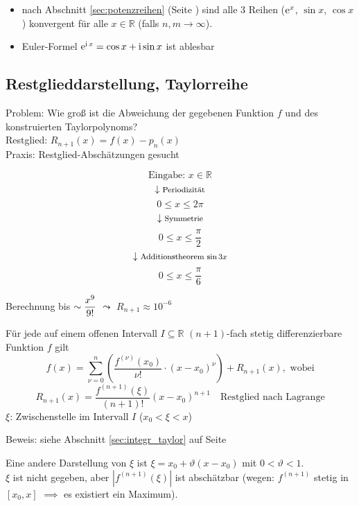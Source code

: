 \begin{note}
  \begin{itemize}
    \item nach Abschnitt \ref{sec:potenzreihen} (Seite \pageref{sec:potenzreihen}) sind alle 3 Reihen ($\operatorname{e}^x$, $\sin x$, $\cos x$) konvergent für alle $x \in \mathbb{R}$ (falls $n, m \rightarrow \infty$).
    \item Euler-Formel $\operatorname{e}^{\operatorname{i} x} = \cos x + \operatorname{i} \sin x$ ist ablesbar
  \end{itemize}
\end{note}

\subsection{Restglieddarstellung, Taylorreihe}
\label{sub:Restglieddarstellung}

Problem: Wie groß ist die Abweichung der gegebenen Funktion $f$ und des konstruierten Taylorpolynoms?\\
Restglied: $R_{n+1}(x) = f(x) - p_n(x)$\\
Praxis: Restglied-Abschätzungen gesucht
%
\begin{example}
  \[ \text{Eingabe: } x \in \mathbb{R} \]
  \[ \downarrow \text{\footnotesize Periodizität} \]
  \[ 0 \leq x \leq 2 \pi \]
  \[ \downarrow \text{\footnotesize Symmetrie} \]
  \[ 0 \leq x \leq \frac \pi 2 \]
  \[ \downarrow \text{\footnotesize Additionstheorem $\sin 3x$} \]
  \[ 0 \leq x \leq \frac \pi 6 \]
  \begin{center} Berechnung bis $\sim\displaystyle \frac{x^9}{9!}$ $\leadsto$ $R_{n+1} \approx 10^{-6}$ \end{center}
\end{example}

\begin{theorem}[Taylorformel]
  Für jede auf einem offenen Intervall $I \subseteq \mathbb{R}$ $(n+1)$-fach stetig differenzierbare Funktion $f$ gilt
  \[ f(x) = \sum_{\nu = 0}^n \left( \frac{f^{(\nu)}(x_0)}{\nu !} \cdot (x - x_0)^\nu \right) + R_{n+1}(x), \text{ wobei}\]
  \[ R_{n+1}(x) = \frac{f^{(n+1)}(\xi)}{(n+1)!} (x-x_0)^{n+1} \quad\text{Restglied nach Lagrange}\]
  $\xi$: Zwischenstelle im Intervall $I$ ($x_0 < \xi < x$)
\end{theorem}

\noindent Beweis: siehe Abschnitt \ref{sec:integr_taylor} auf Seite \pageref{sec:integr_taylor}

\begin{note}
  Eine andere Darstellung von $\xi$ ist $\xi = x_0 + \vartheta (x - x_0)$ mit $0 < \vartheta < 1$.\\
  $\xi$ ist nicht gegeben, aber $\left| f^{(n+1)}(\xi)\right|$ ist abschätzbar (wegen: $f^{(n+1)}$ stetig in $[x_0,x]$ $\implies$ es existiert ein Maximum).
\end{note}

